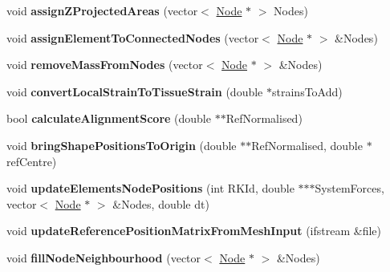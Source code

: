 \begin{DoxyCompactItemize}
\item 
\hypertarget{classShapeBase_aec0c4844fb49f5e54ab31826ecbf6e31}{}void {\bfseries assign\+Z\+Projected\+Areas} (vector$<$ \hyperlink{classNode}{Node} $\ast$ $>$ Nodes)\label{classShapeBase_aec0c4844fb49f5e54ab31826ecbf6e31}

\item 
\hypertarget{classShapeBase_a20cc141f0484b0c488619ef6727eb820}{}void {\bfseries assign\+Element\+To\+Connected\+Nodes} (vector$<$ \hyperlink{classNode}{Node} $\ast$ $>$ \&Nodes)\label{classShapeBase_a20cc141f0484b0c488619ef6727eb820}

\item 
\hypertarget{classShapeBase_a6d09a632b94b324a3bde18a43b31adb8}{}void {\bfseries remove\+Mass\+From\+Nodes} (vector$<$ \hyperlink{classNode}{Node} $\ast$ $>$ \&Nodes)\label{classShapeBase_a6d09a632b94b324a3bde18a43b31adb8}

\item 
\hypertarget{classShapeBase_ad023a96503929e72c59adb2b7ba8fcdf}{}void {\bfseries convert\+Local\+Strain\+To\+Tissue\+Strain} (double $\ast$strains\+To\+Add)\label{classShapeBase_ad023a96503929e72c59adb2b7ba8fcdf}

\item 
\hypertarget{classShapeBase_a1578faef4bfc3c8de9f8f94fd9e6b52d}{}bool {\bfseries calculate\+Alignment\+Score} (double $\ast$$\ast$Ref\+Normalised)\label{classShapeBase_a1578faef4bfc3c8de9f8f94fd9e6b52d}

\item 
\hypertarget{classShapeBase_aa07ce2dcc297aa5aea5a37516dcea069}{}void {\bfseries bring\+Shape\+Positions\+To\+Origin} (double $\ast$$\ast$Ref\+Normalised, double $\ast$ref\+Centre)\label{classShapeBase_aa07ce2dcc297aa5aea5a37516dcea069}

\item 
\hypertarget{classShapeBase_af4df88dad7ec1c487736216e15b5c67a}{}void {\bfseries update\+Elements\+Node\+Positions} (int R\+K\+Id, double $\ast$$\ast$$\ast$System\+Forces, vector$<$ \hyperlink{classNode}{Node} $\ast$ $>$ \&Nodes, double dt)\label{classShapeBase_af4df88dad7ec1c487736216e15b5c67a}

\item 
\hypertarget{classShapeBase_a29d28195e334308f1b3afba113ef1212}{}void {\bfseries update\+Reference\+Position\+Matrix\+From\+Mesh\+Input} (ifstream \&file)\label{classShapeBase_a29d28195e334308f1b3afba113ef1212}

\item 
\hypertarget{classShapeBase_afe299910c51313a27526c585df128047}{}void {\bfseries fill\+Node\+Neighbourhood} (vector$<$ \hyperlink{classNode}{Node} $\ast$ $>$ \&Nodes)\label{classShapeBase_afe299910c51313a27526c585df128047}


\end{DoxyCompactItemize}
